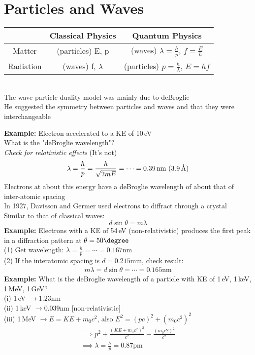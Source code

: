 \documentclass[a4paper, 11pt, fleqn, normalem]{report}
\begin{document}
\section{Particles and Waves}
\begin{tabular}{c|c|c}
              & Classical Physics    & Quantum Physics \\
    \hline
    Matter    & (particles) E, p     & (waves) $\lambda = \frac{h}{p}$, $f = \frac{E}{h}$                    \\
    \hline
    Radiation & (waves) f, $\lambda$ & (particles) $p = \frac{h}{\lambda}$, $E = hf$
\end{tabular} \\
The wave-particle duality model was mainly due to deBroglie \\
He suggested the symmetry between particles and waves and that they were interchangeable

\textbf{Example: }Electron accelerated to a KE of 10\,eV \\
What is the "deBroglie wavelength"? \\
\emph{Check for relativistic effects} (It's not)
\begin{equation*}
    \lambda = \frac{h}{p} = \frac{h}{\sqrt{2mE}} = \cdots = 0.39\,\text{nm}~(3.9\,\text{\r{A}})
\end{equation*}
Electrons at about this energy have a deBroglie wavelength of about that of inter-atomic spacing \\
In 1927, Davisson and Germer used electrons to diffract through a crystal \\
Similar to that of classical waves:
\begin{equation*}
    d\sin{\theta} = m\lambda
\end{equation*}
\textbf{Example: }Electrons with a KE of 54\,eV (non-relativistic) produces the first peak in a diffraction pattern at $\theta = 50\degree$ \\
(1) Get wavelength: $\lambda = \frac{h}{p} = \cdots = 0.167$nm \\
(2) If the interatomic spacing is $d = 0.215$mm, check result:
\begin{gather*}
    m\lambda = d\sin{\theta} = \cdots = 0.165\text{nm}
\end{gather*}
\textbf{Example: }What is the deBroglie wavelength of a particle with KE of 1\,eV, 1\,keV, 1\,MeV, 1\,GeV? \\
(i) 1\,eV $\rightarrow 1.23$nm \\
(ii) 1\,keV $\rightarrow 0.039$nm [non-relativistic] \\
(iii) 1\,MeV $\rightarrow E = KE + m_{0}c^{2}$, also $E^{2} = (pc)^{2} + (m_{0}c^{2})^{2}$
\begin{gather*}
    \implies p^{2} + \frac{(KE + m_{0}c^{2})^{2}}{c^{2}} - \frac{(m_{0}c{2})^{2}}{c^{2}} \\
    \implies \lambda = \frac{h}{p} = 0.87\text{pm}
\end{gather*}
\end{document}

